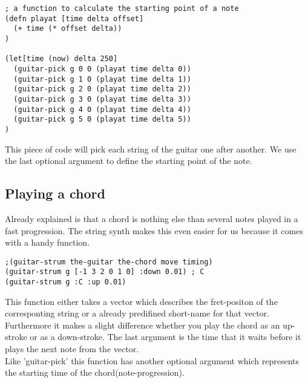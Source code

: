 \begin{lstlisting}
; a function to calculate the starting point of a note
(defn playat [time delta offset]
  (+ time (* offset delta))
)

(let[time (now) delta 250]
  (guitar-pick g 0 0 (playat time delta 0))
  (guitar-pick g 1 0 (playat time delta 1))
  (guitar-pick g 2 0 (playat time delta 2))
  (guitar-pick g 3 0 (playat time delta 3))
  (guitar-pick g 4 0 (playat time delta 4))
  (guitar-pick g 5 0 (playat time delta 5))
)
\end{lstlisting} 

This piece of code will pick each string of the guitar one after another. We use the last optional argument to define the starting point of the note.

\subsection{Playing a chord}
Already explained is that a chord is nothing else than several notes played in a fast progression. The string synth makes this even easier for us because it comes with a handy function.
\begin{lstlisting}
;(guitar-strum the-guitar the-chord move timing)
(guitar-strum g [-1 3 2 0 1 0] :down 0.01) ; C
(guitar-strum g :C :up 0.01)
\end{lstlisting} 
This function either takes a vector which describes the fret-positon of the corresponting string or a already predifined short-name for that vector. Furthermore it makes a slight difference whether you play the chord as an up-stroke or as a down-stroke. The last argument is the time that it waits before it plays the next note from the vector.\\ Like 'guitar-pick' this function has another optional argument which represents the starting time of the chord(note-progression).


